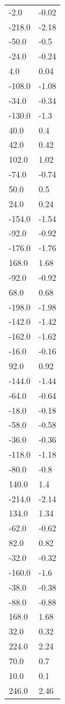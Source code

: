\begin{longtable}{ll}
-2.0 & -0.02 \\
-218.0 & -2.18 \\
-50.0 & -0.5 \\
-24.0 & -0.24 \\
4.0 & 0.04 \\
-108.0 & -1.08 \\
-34.0 & -0.34 \\
-130.0 & -1.3 \\
40.0 & 0.4 \\
42.0 & 0.42 \\
102.0 & 1.02 \\
-74.0 & -0.74 \\
50.0 & 0.5 \\
24.0 & 0.24 \\
-154.0 & -1.54 \\
-92.0 & -0.92 \\
-176.0 & -1.76 \\
168.0 & 1.68 \\
-92.0 & -0.92 \\
68.0 & 0.68 \\
-198.0 & -1.98 \\
-142.0 & -1.42 \\
-162.0 & -1.62 \\
-16.0 & -0.16 \\
92.0 & 0.92 \\
-144.0 & -1.44 \\
-64.0 & -0.64 \\
-18.0 & -0.18 \\
-58.0 & -0.58 \\
-36.0 & -0.36 \\
-118.0 & -1.18 \\
-80.0 & -0.8 \\
140.0 & 1.4 \\
-214.0 & -2.14 \\
134.0 & 1.34 \\
-62.0 & -0.62 \\
82.0 & 0.82 \\
-32.0 & -0.32 \\
-160.0 & -1.6 \\
-38.0 & -0.38 \\
-88.0 & -0.88 \\
168.0 & 1.68 \\
32.0 & 0.32 \\
224.0 & 2.24 \\
70.0 & 0.7 \\
10.0 & 0.1 \\
246.0 & 2.46 \\

\end{longtable}
